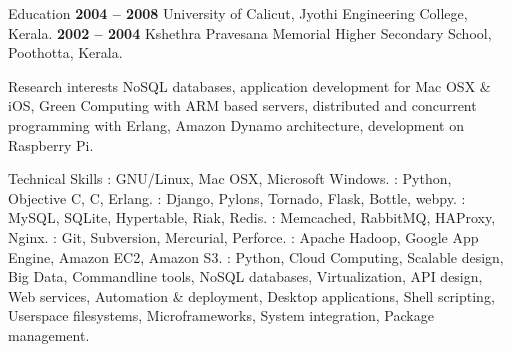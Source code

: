 \documentclass{resume}
\author{Sreejith Kesavan}
\begin{document}
\maketitle


\begin{category}{Education}
   \hfill \textbf{2004 -- 2008}
  \citemnobullet University of Calicut, Jyothi Engineering College, Kerala.
   \hfill \textbf{2002 -- 2004}
  \citemnobullet Kshethra Pravesana Memorial Higher Secondary School, Poothotta, Kerala.
\end{category}


\begin{category}{Research interests}
  \citemnobullet NoSQL databases, application development for Mac OSX \& iOS, Green Computing with 
  ARM based servers, distributed and concurrent programming with Erlang, Amazon Dynamo architecture, 
  development on Raspberry Pi.
\end{category}

\begin{category}{Technical Skills}
  : GNU/Linux, Mac OSX, Microsoft Windows.
  : Python, Objective C, C, Erlang.
  : Django, Pylons, Tornado, Flask, Bottle, webpy.
  : MySQL, SQLite, Hypertable, Riak, Redis.
  : Memcached, RabbitMQ, HAProxy, Nginx.
  : Git, Subversion, Mercurial, Perforce.
  : Apache Hadoop, Google App Engine, Amazon EC2, Amazon S3.
  : Python, Cloud Computing, Scalable design, Big Data, Commandline 
  tools, NoSQL databases, Virtualization, API design, Web services, Automation \& deployment, 
  Desktop applications, Shell scripting, Userspace filesystems, Microframeworks, System integration, 
  Package management.
\end{category}

\end{document}
